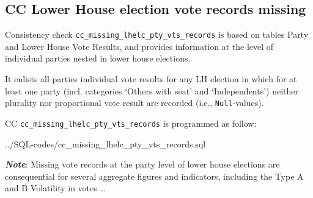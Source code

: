 \subsection{CC Lower House election vote records missing}\label{cc_missing_lhelc_pty_vts_records}
Consistency check \texttt{\footnotesize cc\_missing\_lhelc\_pty\_vts\_records} is based on tables Party and Lower House Vote Results, and provides information at the level of individual parties nested in lower house elections. 

It enlists all parties individual vote results for any LH election in which for at least one party (incl. categories `Others with seat' and `Independents') neither plurality nor proportional vote result are recorded (i.e., \texttt{\footnotesize Null}-values).			

CC \texttt{\footnotesize cc\_missing\_lhelc\_pty\_vts\_records} is programmed as follow: 

%
{../SQL-codes/cc_missing_lhelc_pty_vts_records.sql}

{\em \bf Note}: Missing vote records at the party level of lower house elections are consequential for several aggregate figures and indicators, including the Type A and B Volatility in votes \ldots